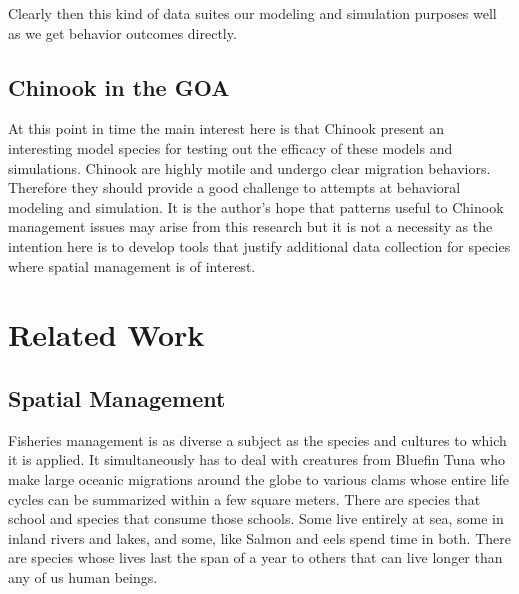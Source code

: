 \documentclass[11pt]{article}
\begin{document}
Clearly then this kind of data suites our modeling and simulation purposes well as we get behavior outcomes directly. 

\subsection{Chinook in the GOA}

At this point in time the main interest here is that Chinook present an interesting model species for testing out the efficacy of these models and simulations. Chinook are highly motile and undergo clear migration behaviors. Therefore they should provide a good challenge to attempts at behavioral modeling and simulation. It is the author's hope that patterns useful to Chinook management issues may arise from this research but it is not a necessity as the intention here is to develop tools that justify additional data collection for species where spatial management is of interest. 





























\newpage















\section{Related Work}



\subsection{Spatial Management}

Fisheries management is as diverse a subject as the species and cultures to which it is applied. It simultaneously has to deal with creatures from Bluefin Tuna who make large oceanic migrations around the globe to various clams whose entire life cycles can be summarized within a few square meters. There are species that school and species that consume those schools. Some live entirely at sea, some in inland rivers and lakes, and some, like Salmon and eels spend time in both. There are species whose lives last the span of a year to others that can live longer than any of us human beings. 
\end{document}
